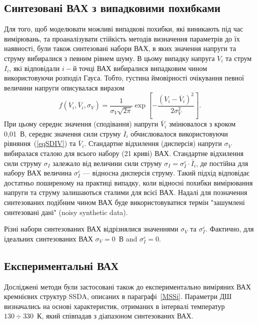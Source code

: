 \subsection{Синтезовані ВАХ з випадковими похибками}
Для того, щоб моделювати можливі випадкові похибки, які виникають під час вимірювань, та проаналізувати стійкість методів визначення параметрів до їх наявності,
були також синтезовані набори ВАХ, в яких значення напруги та струму вибиралися з певним рівнем шуму.
В цьому випадку напруга $V_i$ та струм $I_i$, які відповідали $i-$й точці ВАХ вибиралися випадковим чином використовуючи розподіл Гауса.
Тобто, густина ймовірності очікування певної величини напруги описувалася виразом
\begin{equation}
\label{eqGaus}
f(V_i,\overline{V}_i,\sigma_V)=\frac{1}{\sigma_V\sqrt{2\pi}}\exp\left[-\frac{(V_i-\overline{V}_i)^2}{2\sigma_V^2}\right].
\end{equation}
При цьому середнє значення (сподівання) напруги $\overline{V}_i$ змінювалося з кроком 0,01~В,
середнє значення сили струму $\overline{I}_i$ обчислювалося використовуючи рівняння~(\ref{eqSDIV}) та $\overline{V}_i$.
Стандартне відхилення (дисперсія) напруги $\sigma_V$ вибиралася сталою для всього набору (21 криві) ВАХ.
Стандартне відхилення сили струму $\sigma_I$ залежало від величини сили струму $\sigma_I=\sigma_I^\varepsilon\cdot\overline{I}_i$,
де постійна для набору ВАХ величина $\sigma_I^\varepsilon$ --- відносна дисперсія струму.
Такий підхід відповідає достатньо поширеному на практиці випадку, коли відносні похибки вимірювання напруги та струму залишаються сталими для всієї ВАХ.
Надалі для позначення синтезованих подібним чином ВАХ буде використовуватися термін "зашумлені синтезовані дані" (noisy synthetic data).

Різні набори синтезованих ВАХ відрізнялися значеннями $\sigma_V$ та $\sigma_I^\varepsilon$.
Фактично, для ідеальних синтезованих ВАХ $\sigma_V=0$~В and $\sigma_I^\varepsilon=0$.


\subsection{Експериментальні ВАХ}
Досліджені методи були застосовані також до експериментально виміряних ВАХ кремнієвих структур SSDA, описаних в параграфі~\ref{MSSi}.
Параметри ДШ визначались на основі характеристик, отриманих в інтервалі температур $130\div330$~К, який співпадав з діапазоном синтезованих ВАХ.

